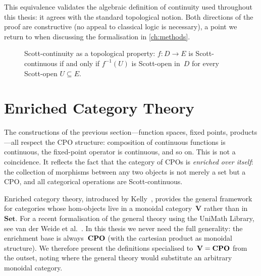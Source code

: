 This equivalence validates the algebraic definition of continuity used
throughout this thesis: it agrees with the standard topological notion.
Both directions of the proof are constructive (no appeal to classical
logic is necessary), a point we return to when discussing the
formalisation in \cref{ch:methods}.

\begin{figure}[h]
\centering
{}
\caption{Scott-continuity as a topological property: $f : D \to E$
  is Scott-continuous if and only if $f^{-1}(U)$ is Scott-open in~$D$
  for every Scott-open $U \subseteq E$.}
\label{fig:scott-continuity}
\end{figure}

\section{Enriched Category Theory}
\label{sec:bg-enriched}

The constructions of the previous section---function spaces, fixed
points, products---all respect the CPO structure: composition of
continuous functions is continuous, the fixed-point operator is
continuous, and so on. This is not a coincidence.  It reflects the fact
that the category of CPOs is \emph{enriched over itself}: the
collection of morphisms between any two objects is not merely a set but
a CPO, and all categorical operations are Scott-continuous.

Enriched category theory, introduced by Kelly~\cite{Kelly1982}, provides
the general framework for categories whose hom-objects live in a
monoidal category~$\mathbf{V}$ rather than in~$\mathbf{Set}$. For a
recent formalisation of the general theory using the UniMath Library, see 
van der Weide et al.~\cite{VanDerWeide2024}. In this thesis we never need 
the full generality: the enrichment base is always~$\mathbf{CPO}$ (with the
cartesian product as monoidal structure). We therefore present the
definitions specialised to~$\mathbf{V} = \mathbf{CPO}$ from the outset, noting
where the general theory would substitute an arbitrary monoidal
category.

